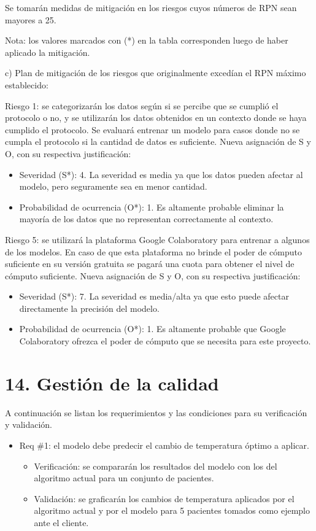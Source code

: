 \documentclass[
11pt, %
]{charter}
\begin{document}
Se tomarán medidas de mitigación en los riesgos cuyos números de RPN sean mayores a 25.

Nota: los valores marcados con (*) en la tabla corresponden luego de haber aplicado la mitigación.

c) Plan de mitigación de los riesgos que originalmente excedían el RPN máximo establecido:
 
Riesgo 1: se categorizarán los datos según si se percibe que se cumplió el protocolo o no, y se utilizarán los datos obtenidos en un contexto donde se haya cumplido el protocolo. Se evaluará entrenar un modelo para casos donde no se cumpla el protocolo si la cantidad de datos es suficiente.
  Nueva asignación de S y O, con su respectiva justificación:
  \begin{itemize}
	\item Severidad (S*): 4.
          La severidad es media ya que los datos pueden afectar al modelo, pero seguramente sea en menor cantidad.
	\item Probabilidad de ocurrencia (O*): 1.
          Es altamente probable eliminar la mayoría de los datos que no representan correctamente al contexto.
	\end{itemize}

Riesgo 5: se utilizará la plataforma Google Colaboratory para entrenar a algunos de los modelos. En caso de que esta plataforma no brinde el poder de cómputo suficiente en su versión gratuita se pagará una cuota para obtener el nivel de cómputo suficiente.
Nueva asignación de S y O, con su respectiva justificación:
\begin{itemize}
	\item Severidad (S*): 7.
	La severidad es media/alta ya que esto puede afectar directamente la precisión del modelo.
	\item Probabilidad de ocurrencia (O*): 1.
	Es altamente probable que Google Colaboratory ofrezca el poder de cómputo que se necesita para este proyecto.
\end{itemize}

\section{14. Gestión de la calidad}
\label{sec:calidad}

A continuación se listan los requerimientos y las condiciones para su verificación y validación.

\begin{itemize} 
\item Req \#1: el modelo debe predecir el cambio de temperatura óptimo a aplicar.

\begin{itemize}
	\item Verificación: se compararán los resultados del modelo con los del algoritmo actual para un conjunto de pacientes.
	\item Validación: se graficarán los cambios de temperatura aplicados por el algoritmo actual y por el modelo para 5 pacientes tomados como ejemplo ante el cliente.
\end{itemize}

\end{itemize}
\end{document}
